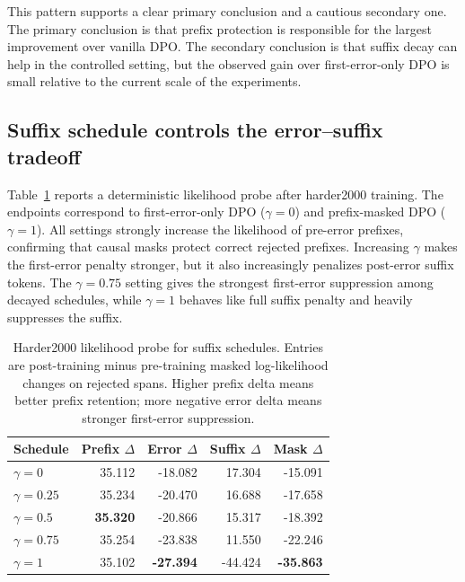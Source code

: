 This pattern supports a clear primary conclusion and a cautious secondary one. The primary conclusion is that prefix protection is responsible for the largest improvement over vanilla DPO. The secondary conclusion is that suffix decay can help in the controlled setting, but the observed gain over first-error-only DPO is small relative to the current scale of the experiments.

\subsection{Suffix schedule controls the error--suffix tradeoff}

Table~\ref{tab:gamma-likelihood} reports a deterministic likelihood probe after harder2000 training. The endpoints correspond to first-error-only DPO ($\gamma=0$) and prefix-masked DPO ($\gamma=1$). All settings strongly increase the likelihood of pre-error prefixes, confirming that causal masks protect correct rejected prefixes. Increasing $\gamma$ makes the first-error penalty stronger, but it also increasingly penalizes post-error suffix tokens. The $\gamma=0.75$ setting gives the strongest first-error suppression among decayed schedules, while $\gamma=1$ behaves like full suffix penalty and heavily suppresses the suffix.

\begin{table}[t]
\caption{Harder2000 likelihood probe for \cmdpo{} suffix schedules. Entries are post-training minus pre-training masked log-likelihood changes on rejected spans. Higher prefix delta means better prefix retention; more negative error delta means stronger first-error suppression.}
\label{tab:gamma-likelihood}
\begin{center}
\begin{tabular}{lrrrr}
\toprule
Schedule & Prefix $\Delta$ & Error $\Delta$ & Suffix $\Delta$ & Mask $\Delta$ \\
\midrule
$\gamma=0$ & 35.112 & -18.082 & 17.304 & -15.091 \\
$\gamma=0.25$ & 35.234 & -20.470 & 16.688 & -17.658 \\
$\gamma=0.5$ & \textbf{35.320} & -20.866 & 15.317 & -18.392 \\
$\gamma=0.75$ & 35.254 & -23.838 & 11.550 & -22.246 \\
$\gamma=1$ & 35.102 & \textbf{-27.394} & -44.424 & \textbf{-35.863} \\
\bottomrule
\end{tabular}
\end{center}
\end{table}


